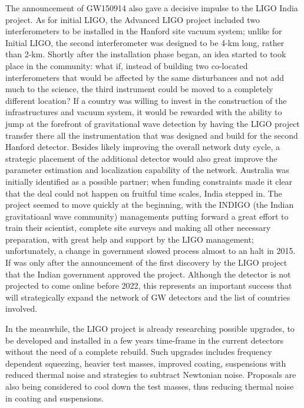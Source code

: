 The announcement of GW150914 also gave a decisive impulse to the LIGO India project. As for initial LIGO, the Advanced LIGO project included two interferometers to be installed in the Hanford site vacuum system; unlike for Initial LIGO, the second interferometer was designed to be 4-km long, rather than 2-km. Shortly after the installation phase began, an idea started to took place in the community: what if, instead of building two co-located interferometers that would be affected by the same disturbances and not add much to the science, the third instrument could be moved to a completely different location? If a country was willing to invest in the construction of the infrastructures and vacuum system, it would be rewarded with the ability to jump at the forefront of gravitational wave detection by having the LIGO project transfer there all the instrumentation that was designed and build for the second Hanford detector. Besides likely improving the overall network duty cycle, a strategic placement of the additional detector would also great improve the parameter estimation and localization capability of the network.
Australia was initially identified as a possible partner; when funding constraints made it clear that the deal could not happen on fruitful time scales, India stepped in. The project seemed to move quickly at the beginning, with the INDIGO (the Indian gravitatioanl wave community) managements putting forward a great effort to train their scientist, complete site surveys and making all other necessary preparation, with great help and support by the LIGO management; unfortunately, a change in government slowed process almost to an halt in 2015. If was only after the announcement of the first discovery by the LIGO project that the Indian government approved the project. Although the detector is not projected to come online before 2022, this represents an important success that will strategically expand the network of GW detectors and the list of countries involved.

In the meanwhile, the LIGO project is already researching possible upgrades, to be developed and installed in a few years time-frame in the current detectors without the need of a complete rebuild. Such upgrades includes frequency dependent squeezing, heavier test masses, improved coating, suspensions with reduced thermal noise and strategies to subtract Newtonian noise. Proposals are also being considered to cool down the test masses, thus reducing thermal noise in coating and suspensions.


